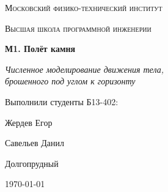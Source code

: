 \begin{titlepage}
    \centering
    {\scshape\Large Московский физико-технический институт \par}
    \vspace{1cm}
    {\scshape\Large Высшая школа программной инженерии \par}
    \vspace{2cm}
    {\huge \textbf{М1. Полёт камня} \par}
    \vspace{1.5cm}
    {\Large \textit{Численное моделирование движения тела, \\ 
    брошенного под углом к горизонту} \par}
    \vspace{2cm}
    {\Large Выполнили студенты Б13-402: \par}
    {\Large Жердев Егор \par}
    {\Large Савельев Данил \par}
    \vfill
    {\large Долгопрудный \par}
    {\large \today \par}
\end{titlepage}